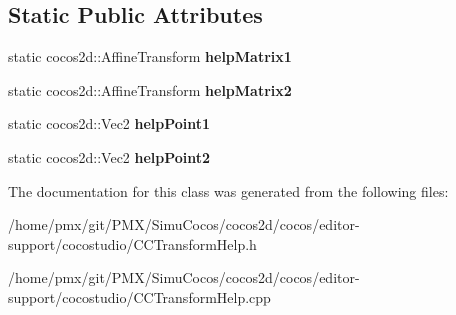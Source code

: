 \subsection*{Static Public Attributes}
\begin{DoxyCompactItemize}
\item 
\mbox{\label{classcocostudio_1_1TransformHelp_a4d77ae7f182f7d0973ced2ded3de71d3}} 
static cocos2d\+::\+Affine\+Transform {\bfseries help\+Matrix1}
\item 
\mbox{\label{classcocostudio_1_1TransformHelp_a487bffcdc3cb83af3ea34fdb420e6c43}} 
static cocos2d\+::\+Affine\+Transform {\bfseries help\+Matrix2}
\item 
\mbox{\label{classcocostudio_1_1TransformHelp_acc9b0873a553edc4f99551c6e4ac2c51}} 
static cocos2d\+::\+Vec2 {\bfseries help\+Point1}
\item 
\mbox{\label{classcocostudio_1_1TransformHelp_ab0e57219c619c416a2300e07964b55b7}} 
static cocos2d\+::\+Vec2 {\bfseries help\+Point2}
\end{DoxyCompactItemize}


The documentation for this class was generated from the following files\+:\begin{DoxyCompactItemize}
\item 
/home/pmx/git/\+P\+M\+X/\+Simu\+Cocos/cocos2d/cocos/editor-\/support/cocostudio/C\+C\+Transform\+Help.\+h\item 
/home/pmx/git/\+P\+M\+X/\+Simu\+Cocos/cocos2d/cocos/editor-\/support/cocostudio/C\+C\+Transform\+Help.\+cpp\end{DoxyCompactItemize}
